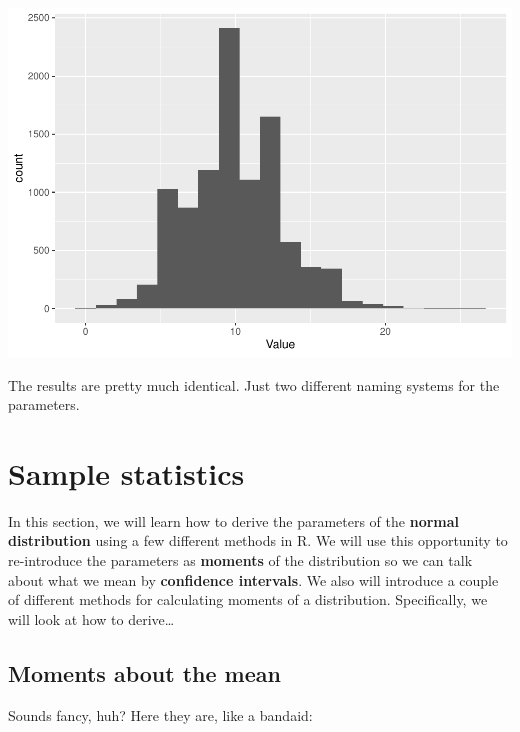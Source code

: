 \documentclass[
]{book}
\begin{document}
\includegraphics{worstr_files/figure-latex/unnamed-chunk-144-1.pdf}

The results are pretty much identical. Just two different naming systems for the parameters.

\hypertarget{sample-statistics}{%
\section{Sample statistics}\label{sample-statistics}}

In this section, we will learn how to derive the parameters of the \textbf{normal distribution} using a few different methods in R. We will use this opportunity to re-introduce the parameters as \textbf{moments} of the distribution so we can talk about what we mean by \textbf{confidence intervals}. We also will introduce a couple of different methods for calculating moments of a distribution. Specifically, we will look at how to derive\ldots{}

\hypertarget{moments-about-the-mean}{%
\subsection{Moments about the mean}\label{moments-about-the-mean}}

Sounds fancy, huh? Here they are, like a bandaid:
\end{document}
